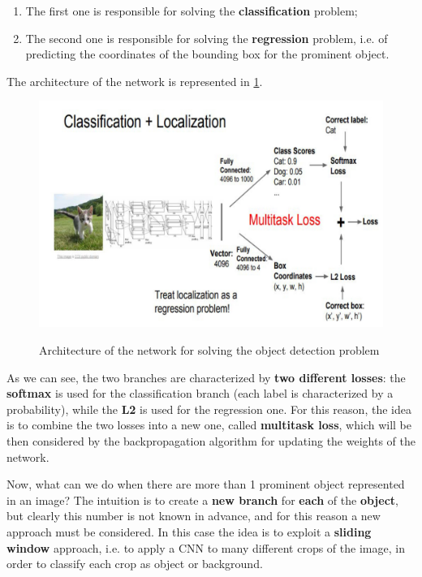 \begin{enumerate}
    \item The first one is responsible for solving the \textbf{classification} problem;
    \item The second one is responsible for solving the \textbf{regression} problem, i.e. of predicting the coordinates of the bounding box for the prominent object.
\end{enumerate}

The architecture of the network is represented in \ref{object detection 2}.

\begin{figure}[h!]
		\centering
        \includegraphics[scale = 0.35]{img/object detection2.jpeg}
		\label{object detection 2}
        \caption{Architecture of the network for solving the object detection problem}
\end{figure}

As we can see, the two branches are characterized by \textbf{two different losses}: the \textbf{softmax} is used for the classification branch (each label is characterized by a probability), while the \textbf{L2} is used for the regression one. For this reason, the idea is to combine the two losses into a new one, called \textbf{multitask loss}, which will be then considered by the backpropagation algorithm for updating the weights of the network.

Now, what can we do when there are more than 1 prominent object represented in an image? The intuition is to create a \textbf{new branch} for \textbf{each} of the \textbf{object}, but clearly this number is not known in advance, and for this reason a new approach must be considered. In this case the idea is to exploit a \textbf{sliding window} approach, i.e. to apply a CNN to many different crops of the image, in order to classify each crop as object or background.

